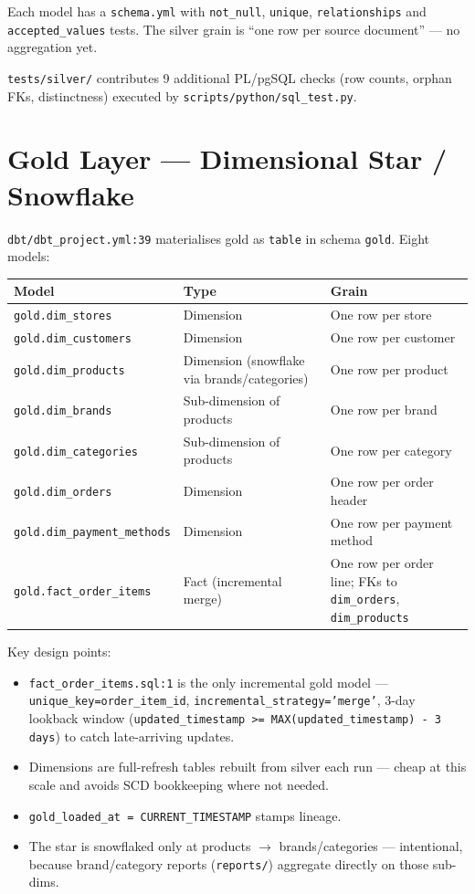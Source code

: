 \documentclass[11pt,a4paper]{article}
\begin{document}
Each model has a \texttt{schema.yml} with \texttt{not\_null}, \texttt{unique}, \texttt{relationships} and \texttt{accepted\_values} tests. The silver grain is ``one row per source document'' — no aggregation yet.

\texttt{tests/silver/} contributes 9 additional PL/pgSQL checks (row counts, orphan FKs, distinctness) executed by \texttt{scripts/python/sql\_test.py}.

\section{Gold Layer — Dimensional Star / Snowflake}

\texttt{dbt/dbt\_project.yml:39} materialises gold as \texttt{table} in schema \texttt{gold}. Eight models:

\begin{center}
\begin{longtable}{l l p{7.2cm}}
\toprule
Model & Type & Grain \\
\midrule
\endhead
\texttt{gold.dim\_stores} & Dimension & One row per store \\
\texttt{gold.dim\_customers} & Dimension & One row per customer \\
\texttt{gold.dim\_products} & Dimension (snowflake via brands/categories) & One row per product \\
\texttt{gold.dim\_brands} & Sub-dimension of products & One row per brand \\
\texttt{gold.dim\_categories} & Sub-dimension of products & One row per category \\
\texttt{gold.dim\_orders} & Dimension & One row per order header \\
\texttt{gold.dim\_payment\_methods} & Dimension & One row per payment method \\
\texttt{gold.fact\_order\_items} & Fact (incremental merge) & One row per order line; FKs to \texttt{dim\_orders}, \texttt{dim\_products} \\
\bottomrule
\end{longtable}
\end{center}

Key design points:
\begin{itemize}[leftmargin=1.4em]
  \item \texttt{fact\_order\_items.sql:1} is the only incremental gold model — \texttt{unique\_key=order\_item\_id}, \texttt{incremental\_strategy='merge'}, 3-day lookback window (\texttt{updated\_timestamp >= MAX(updated\_timestamp) - 3 days}) to catch late-arriving updates.
  \item Dimensions are full-refresh tables rebuilt from silver each run — cheap at this scale and avoids SCD bookkeeping where not needed.
  \item \texttt{gold\_loaded\_at = CURRENT\_TIMESTAMP} stamps lineage.
  \item The star is snowflaked only at products $\rightarrow$ brands/categories — intentional, because brand/category reports (\texttt{reports/}) aggregate directly on those sub-dims.
\end{itemize}
\end{document}
